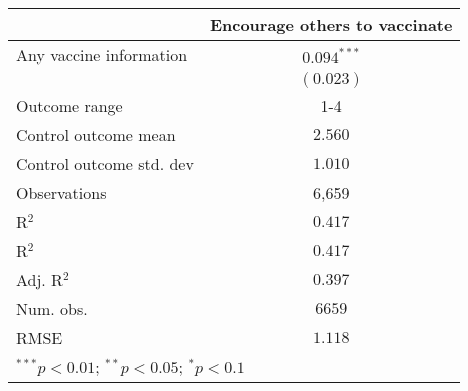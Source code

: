 
\begin{table}
\begin{center}
\begin{tabular}{l c}
\hline
 & Encourage others to vaccinate \\
\hline
Any vaccine information  & $0.094^{***}$ \\
                         & $(0.023)$     \\
\hline
Outcome range            & 1-4           \\
Control outcome mean     & $2.560$       \\
Control outcome std. dev & $1.010$       \\
Observations             & 6,659         \\
R$^{2}$                  & $0.417$       \\
R$^2$                    & $0.417$       \\
Adj. R$^2$               & $0.397$       \\
Num. obs.                & $6659$        \\
RMSE                     & $1.118$       \\
\hline
\multicolumn{2}{l}{\scriptsize{$^{***}p<0.01$; $^{**}p<0.05$; $^{*}p<0.1$}}
\end{tabular}
\caption{}
\label{table:Tables and Figures/SI_table21_anyinfo_pooled_encourage1-4}
\end{center}
\end{table}
